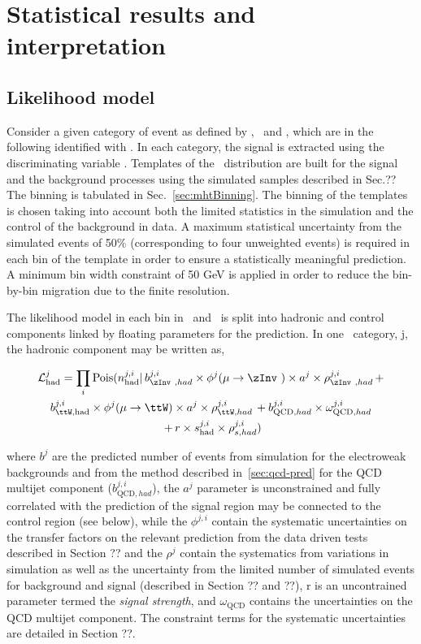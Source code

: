 \chapter{Statistical results and interpretation}
\section{Likelihood model}
\label{sec:likelihood}

Consider a given category of event as defined by \njet, \nb~and \scalht, which are in the following identified with \htcat. 
In each category, the signal is extracted using the discriminating variable \mht. 
Templates of the \mht~distribution are built for the signal and the background processes 
using the simulated samples described in Sec.?? The \mht binning is tabulated in Sec.~\ref{sec:mhtBinning}.
The binning of the templates is chosen taking into account both the limited statistics in the simulation and 
the control of the background in data. 
A maximum statistical uncertainty from the simulated events of 50\% (corresponding to four unweighted events) 
is required in each bin of the template in order to ensure a statistically meaningful prediction. 
A minimum bin width constraint of 50 GeV is applied in order to reduce the bin-by-bin migration 
due to the finite \mht resolution.

The likelihood model in each bin in \mht~and \htcat~is split into hadronic and control components linked
by floating parameters for the prediction. In one \htcat~category, j, the hadronic component may be written as,

\begin{multline}
\label{eq:hadronicLikelihood}
\mathcal{L}^{j}_{\mathrm{had}} = \prod_i \mathrm{Pois}(n^{j,i}_{\mathrm{had}} |\, b^{j,i}_{\zInv~,had}\times\phi^{j}(\mu\rightarrow\zInv~)\times a^{j}\times\rho^{j,i}_{\zInv~,had}\, + \\ 
b^{j,i}_{\ttW,\mathrm{had}}\times\phi^{j}(\mu\rightarrow\ttW)\times a^{j}\times\rho^{j,i}_{\ttW,had}\, + b^{j,i}_{\text{QCD},had}\times\omega^{j,i}_{\text{QCD},had}\\\
+ \,r\times s^{j,i}_{\mathrm{had}}\times\rho^{j,i}_{s,had}) 
\end{multline}

where $b^{j}$ are the predicted number of events from simulation for the electroweak
backgrounds and from the method described in~\ref{sec:qcd-pred} for the QCD multijet component ($b^{j,i}_{\text{QCD},had}$), 
the $a^{j}$ parameter is unconstrained and fully correlated with the prediction of the signal region may be connected 
to the control region (see below), while the $\phi^{j,i}$ contain the systematic uncertainties on the 
transfer factors on the relevant prediction from the data driven tests described in Section ?? and the 
$\rho^{j}$ contain the systematics from variations in simulation as well as the uncertainty from the limited number of 
simulated events for background and signal (described in Section ?? and ??), r is an uncontrained parameter 
termed the \emph{signal strength}, and $\omega_{\text{QCD}}$ contains the uncertainties on the QCD multijet component. 
The constraint terms for the systematic uncertainties are detailed in Section ??.

